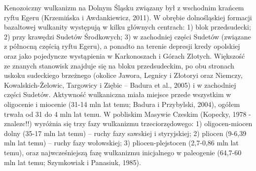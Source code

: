 \documentclass[11.5pt,twoside]{report}
\begin{document}
Kenozoiczny wulkanizm na Dolnym Śląsku związany był z wschodnim krańcem ryftu Egeru (Krzemińska i Awdankiewicz, 2011). W obrębie dolnośląskiej formacji bazaltowej wulkanity występują w kilku głównych centrach: 1) blok przedsudecki; 2) przy krawędzi Sudetów Środkowych; 3) w zachodniej części Sudetów (związane z północną częścią ryftu Egeru), a ponadto na terenie depresji kredy opolskiej oraz jako pojedyncze wystąpienia w Karkonoszach i Górach Złotych. Większość ze znanych stanowisk znajduje się na bloku przedsudeckim, po obu stronach uskoku sudeckiego brzeżnego (okolice Jawora, Legnicy i Złotoryi oraz Niemczy, Kowalskich-Żelowic, Targowicy i Ziębic -- Badura et al., 2005) i w zachodniej części Sudetów. Aktywność wulkaniczna miała miejsce przede wszystkim w oligocenie i miocenie (31-14 mln lat temu; Badura i Przybylski, 2004), ogółem trwała od 31 do 4 mln lat temu. W pobliskim Masywie Czeskim (Kopecky, 1978 - znalezc!!) wyróżnia się trzy fazy wulkanizmu trzeciorzędowego: 1) oligocen-miocen dolny (35-17 mln lat temu) -- ruchy fazy sawskiej i styryjskiej; 2) pliocen (9-6,39 mln lat temu) -- ruchy fazy wołowskiej; 3) pliocen-plejstocen (2,7-0,86 mln lat temu), oraz najwcześniejszą fazę wulkanizmu inicjalnego w paleogenie (64,7-60 mln lat temu; Szymkowiak i Panasiuk, 1985).

\end{document}
